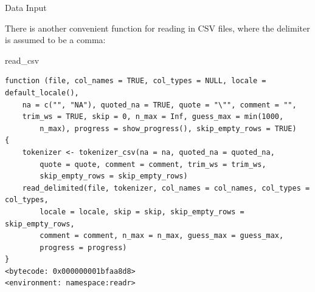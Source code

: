 \documentclass[
  ignorenonframetext,
]{beamer}
\newenvironment{Shaded}{\begin{snugshade}}{\end{snugshade}}
\newcommand{\NormalTok}[1]{#1}
\begin{document}
\begin{frame}[fragile]{Data Input}
\protect\hypertarget{data-input-7}{}

There is another convenient function for reading in CSV files, where the
delimiter is assumed to be a comma:

\begin{Shaded}
\begin{Highlighting}[]
\NormalTok{read_csv}
\end{Highlighting}
\end{Shaded}

\begin{verbatim}
function (file, col_names = TRUE, col_types = NULL, locale = default_locale(), 
    na = c("", "NA"), quoted_na = TRUE, quote = "\"", comment = "", 
    trim_ws = TRUE, skip = 0, n_max = Inf, guess_max = min(1000, 
        n_max), progress = show_progress(), skip_empty_rows = TRUE) 
{
    tokenizer <- tokenizer_csv(na = na, quoted_na = quoted_na, 
        quote = quote, comment = comment, trim_ws = trim_ws, 
        skip_empty_rows = skip_empty_rows)
    read_delimited(file, tokenizer, col_names = col_names, col_types = col_types, 
        locale = locale, skip = skip, skip_empty_rows = skip_empty_rows, 
        comment = comment, n_max = n_max, guess_max = guess_max, 
        progress = progress)
}
<bytecode: 0x000000001bfaa8d8>
<environment: namespace:readr>
\end{verbatim}

\end{frame}
\end{document}
